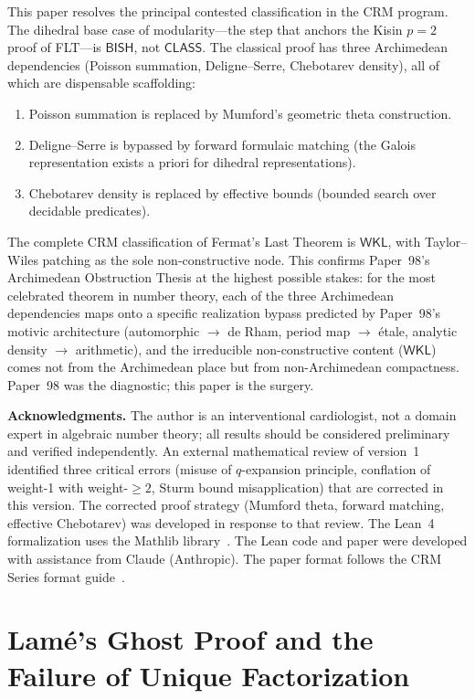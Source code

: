 \documentclass[11pt,a4paper]{article}
\theoremstyle{plain}
\theoremstyle{definition}
\newcommand{\BISH}{\textsf{BISH}}
\newcommand{\WKL}{\textsf{WKL}}
\newcommand{\CLASS}{\textsf{CLASS}}
\begin{document}
This paper resolves the principal contested classification in the CRM program.
The dihedral base case of modularity---the step that anchors the Kisin $p = 2$ proof of FLT---is $\BISH$, not $\CLASS$.
The classical proof has three Archimedean dependencies (Poisson summation, Deligne--Serre, Chebotarev density), all of which are dispensable scaffolding:
\begin{enumerate}[label=(\roman*)]
\item Poisson summation is replaced by Mumford's geometric theta construction.
\item Deligne--Serre is bypassed by forward formulaic matching (the Galois representation exists a priori for dihedral representations).
\item Chebotarev density is replaced by effective bounds (bounded search over decidable predicates).
\end{enumerate}

The complete CRM classification of Fermat's Last Theorem is $\WKL$, with Taylor--Wiles patching as the sole non-constructive node.
This confirms Paper~98's Archimedean Obstruction Thesis at the highest possible stakes: for the most celebrated theorem in number theory, each of the three Archimedean dependencies maps onto a specific realization bypass predicted by Paper~98's motivic architecture (automorphic $\to$ de Rham, period map $\to$ \'etale, analytic density $\to$ arithmetic), and the irreducible non-constructive content ($\WKL$) comes not from the Archimedean place but from non-Archimedean compactness.
Paper~98 was the diagnostic; this paper is the surgery.

\bigskip
\noindent\textbf{Acknowledgments.}
The author is an interventional cardiologist, not a domain expert in algebraic number theory; all results should be considered preliminary and verified independently.
An external mathematical review of version~1 identified three critical errors (misuse of $q$-expansion principle, conflation of weight-1 with weight-$\geq 2$, Sturm bound misapplication) that are corrected in this version.
The corrected proof strategy (Mumford theta, forward matching, effective Chebotarev) was developed in response to that review.
The Lean~4 formalization uses the Mathlib library~\cite{mathlib}.
The Lean code and paper were developed with assistance from Claude (Anthropic).
The paper format follows the CRM Series format guide~\cite{formatguide}.


\appendix
\section{Lam\'e's Ghost Proof and the Failure of Unique Factorization}\label{app:ghost}
\end{document}
